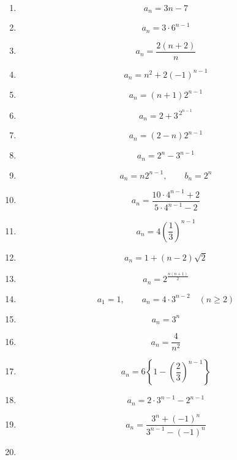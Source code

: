 \begin{enumerate}[label=\textbf{問\arabic*.},leftmargin=3.8em,format=\bookitemlink{practice-basic}{answer}{problem}]
          \item \[
                  a_n=3n-7
                \]
          \item \[
                  a_n=3\cdot6^{n-1}
                \]
          \item \[
                  a_n=\frac{2(n+2)}n
                \]
          \item \[
                  a_n=n^2+2(-1)^{n-1}
                \]
          \item \[
                  a_n=(n+1)2^{n-1}
                \]
          \item \[
                  a_n=2+3^{\,2^{n-1}}
                \]
          \item \[
                  a_n=(2-n)2^{n-1}
                \]
          \item \[
                  a_n=2^n-3^{n-1}
                \]
          \item \[
                  a_n=n2^{n-1},\qquad b_n=2^n
                \]
          \item \[
                  a_n=\frac{10\cdot4^{n-1}+2}{5\cdot4^{n-1}-2}
                \]
          \item \[
                  a_n=4\left(\frac13\right)^{n-1}
                \]
          \item \[
                  a_n=1+(n-2)\sqrt2
                \]
          \item \[
                  a_n=2^{\frac{n(n+1)}2}
                \]
          \item \[
                  a_1=1,\qquad a_n=4\cdot3^{n-2}\quad(n\ge2)
                \]
          \item \[
                  a_n=3^n
                \]
          \item \[
                  a_n=\frac4{n^2}
                \]
          \item \[
                  a_n=6\left\{1-\left(\frac23\right)^{n-1}\right\}
                \]
          \item \[
                  a_n=2\cdot3^{n-1}-2^{n-1}
                \]
          \item \[
                  a_n=\frac{3^n+(-1)^n}{3^{n-1}-(-1)^n}
                \]
          \item \[
\]
\end{enumerate}
